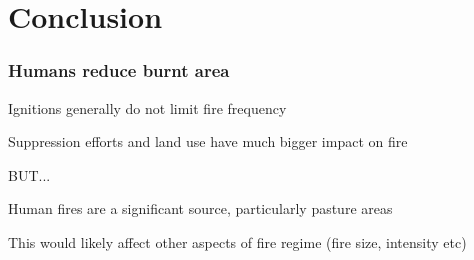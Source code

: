 \section{Conclusion}


\begin{frame}
    \frametitle{Humans reduce burnt area}
	\begin{itemize}
		\large{
			\item Ignitions generally do not limit fire frequency
			\item Suppression efforts and land use have much bigger impact on fire
		}
	\end{itemize}
	\huge{BUT...}
	\begin{itemize}
		\large{
			\item Human fires are a significant source, particularly pasture areas
			\item This would likely affect other aspects of fire regime (fire size, intensity etc)
		}
	\end{itemize}
\end{frame}

	



